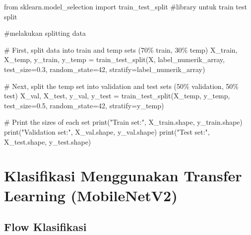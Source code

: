 \documentclass[
  letterpaper,
  DIV=11,
  numbers=noendperiod]{scrreprt}
\newenvironment{Shaded}{\begin{snugshade}}{\end{snugshade}}
\newcommand{\BuiltInTok}[1]{\textcolor[rgb]{0.00,0.23,0.31}{#1}}
\newcommand{\CommentTok}[1]{\textcolor[rgb]{0.37,0.37,0.37}{#1}}
\newcommand{\DecValTok}[1]{\textcolor[rgb]{0.68,0.00,0.00}{#1}}
\newcommand{\FloatTok}[1]{\textcolor[rgb]{0.68,0.00,0.00}{#1}}
\newcommand{\ImportTok}[1]{\textcolor[rgb]{0.00,0.46,0.62}{#1}}
\newcommand{\NormalTok}[1]{\textcolor[rgb]{0.00,0.23,0.31}{#1}}
\newcommand{\OperatorTok}[1]{\textcolor[rgb]{0.37,0.37,0.37}{#1}}
\newcommand{\StringTok}[1]{\textcolor[rgb]{0.13,0.47,0.30}{#1}}
\begin{document}
\begin{Shaded}
\begin{Highlighting}[]
\ImportTok{from}\NormalTok{ sklearn.model\_selection }\ImportTok{import}\NormalTok{ train\_test\_split }\CommentTok{\#library untuk train test split}

\CommentTok{\#melakukan splitting data}


\CommentTok{\# First, split data into train and temp sets (70\% train, 30\% temp)}
\NormalTok{X\_train, X\_temp, y\_train, y\_temp }\OperatorTok{=}\NormalTok{ train\_test\_split(X, label\_numerik\_array, test\_size}\OperatorTok{=}\FloatTok{0.3}\NormalTok{, random\_state}\OperatorTok{=}\DecValTok{42}\NormalTok{, stratify}\OperatorTok{=}\NormalTok{label\_numerik\_array)}

\CommentTok{\# Next, split the temp set into validation and test sets (50\% validation, 50\% test)}
\NormalTok{X\_val, X\_test, y\_val, y\_test }\OperatorTok{=}\NormalTok{ train\_test\_split(X\_temp, y\_temp, test\_size}\OperatorTok{=}\FloatTok{0.5}\NormalTok{, random\_state}\OperatorTok{=}\DecValTok{42}\NormalTok{, stratify}\OperatorTok{=}\NormalTok{y\_temp)}

\CommentTok{\# Print the sizes of each set}
\BuiltInTok{print}\NormalTok{(}\StringTok{"Train set:"}\NormalTok{, X\_train.shape, y\_train.shape)}
\BuiltInTok{print}\NormalTok{(}\StringTok{"Validation set:"}\NormalTok{, X\_val.shape, y\_val.shape)}
\BuiltInTok{print}\NormalTok{(}\StringTok{"Test set:"}\NormalTok{, X\_test.shape, y\_test.shape)}
\end{Highlighting}
\end{Shaded}

\hypertarget{klasifikasi-menggunakan-transfer-learning-mobilenetv2}{%
\section*{Klasifikasi Menggunakan Transfer Learning
(MobileNetV2)}\label{klasifikasi-menggunakan-transfer-learning-mobilenetv2}}


\hypertarget{flow-klasifikasi}{%
\subsection*{Flow Klasifikasi}\label{flow-klasifikasi}}
\end{document}
